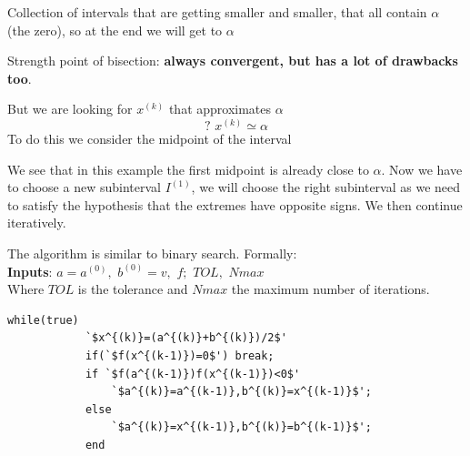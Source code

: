 Collection of intervals that are getting smaller and smaller, that all contain $\alpha$ (the zero), so at the end we will get to $\alpha$

Strength point of bisection: \textbf{always convergent, but has a lot of drawbacks too}.

But we are looking for $x^{(k)}$ that approximates $\alpha$
$$?\,\,x^{(k)}\simeq\alpha$$
To do this we consider the midpoint of the interval

\begin{figure}[!ht]
    \begin{minipage}{\linewidth}
        \centering
    \end{minipage}
\end{figure}

We see that in this example the first midpoint is already close to $\alpha$. Now we have to choose a new subinterval $I^{(1)}$, we will choose the right subinterval as we need to satisfy the hypothesis that the extremes have opposite signs. We then continue iteratively.

The algorithm is similar to binary search. Formally:\\
\textbf{Inputs}: $a=a^{(0)},\,\,b^{(0)}=v,\,\,f;\,\,TOL,\,\,Nmax$\\
Where $TOL$ is the tolerance and $Nmax$ the maximum number of iterations.

\begin{center}
    \begin{lstlisting}[escapeinside=`']
        while(true)
            `$x^{(k)}=(a^{(k)}+b^{(k)})/2$'
            if(`$f(x^{(k-1)})=0$') break;
            if `$f(a^{(k-1)})f(x^{(k-1)})<0$'
                `$a^{(k)}=a^{(k-1)},b^{(k)}=x^{(k-1)}$';
            else
                `$a^{(k)}=x^{(k-1)},b^{(k)}=b^{(k-1)}$';
            end
        \end{lstlisting}
\end{center}

